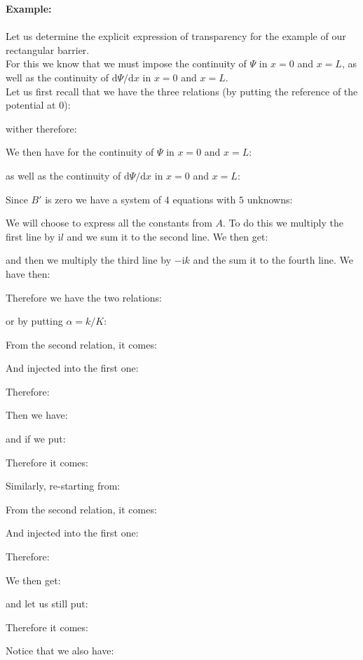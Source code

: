 	\begin{tcolorbox}[colframe=black,colback=white,sharp corners]
	\textbf{{\Large {}}Example:}\\\\
	Let us determine the explicit expression of transparency for the example of our rectangular barrier.\\ 

	For this we know that we must impose the continuity of $\Psi$ in $x=0$ and $x=L$, as well as the continuity of $\mathrm{d}\Psi/\mathrm{d}x$ in $x=0$ and $x=L$.\\

	Let us first recall that we have the three relations (by putting the reference of the potential at $0$):
	
	wither therefore:
	
	We then have for the continuity of $\Psi$ in $x=0$ and $x=L$:
	
	as well as the continuity of $\mathrm{d}\Psi/\mathrm{d}x$ in $x=0$ and $x=L$:
	
	Since $B'$ is zero we have a system of $4$ equations with $5$ unknowns:
	
	We will choose to express all the constants from $A$. To do this we multiply the first line by $\mathrm{i}l$ and we sum it to the second line. We then get:
	
	and then we multiply the third line by $-\mathrm{i}k$ and the sum it to the fourth line. We have then:
	\end{tcolorbox}
	
	\begin{tcolorbox}[colframe=black,colback=white,sharp corners]
	
	Therefore we have the two relations:
	
	or by putting $\alpha=k/K$:
	
	From the second relation, it comes:
	
	And injected into the first one:
	
	Therefore:
	
	Then we have:
	
	and if we put:
	
	Therefore it comes:
	
	Similarly, re-starting from:
	
	From the second relation, it comes:
	\end{tcolorbox}
	
	\begin{tcolorbox}[colframe=black,colback=white,sharp corners]
	
	And injected into the first one:
	
	Therefore:
	
	We then get:
	
	and let us still put:
	
	Therefore it comes:
	
	Notice that we also have:
	
	\end{tcolorbox}
	
